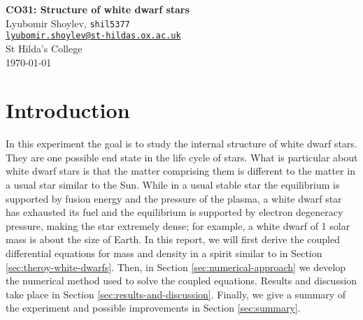 \documentclass[]{article}
\begin{document}


\begin{center}
	\Large{\textbf{CO31: Structure of white dwarf stars}\\
	\vspace{1em}
	\large{Lyubomir Shoylev, \texttt{shil5377}}\\ \href{mailto:me@example.com}{\texttt{lyubomir.shoylev@st-hildas.ox.ac.uk}}}\\
	\large{St Hilda's College}\\
	\today
\end{center}

\begin{abstract}
	This will be the abstract of the report. It shall be written when the rest is nearly done.
\end{abstract}

\section{Introduction}
	In this experiment the goal is to study the internal structure of white dwarf stars. They are one possible end state in the life cycle of stars. What is particular about white dwarf stars is that the matter comprising them is different to the matter in a usual star similar to the Sun. While in a usual stable star the equilibrium is supported by fusion energy and the pressure of the plasma, a white dwarf star has exhausted its fuel and the equilibrium is supported by electron degeneracy pressure, making the star extremely dense; for example, a white dwarf of 1 solar mass is about the size of Earth. In this report, we will first derive the coupled differential equations for mass and density in a spirit similar to \cite{chandrasekhar-white-dwarf} in Section \ref{sec:theroy-white-dwarfs}. Then, in Section \ref{sec:numerical-approach} we develop the numerical method used to solve the coupled equations. Results and discussion take place in Section \ref{sec:results-and-discussion}. Finally, we give a summary of the experiment and possible improvements in Section \ref{sec:summary}.
\end{document}
